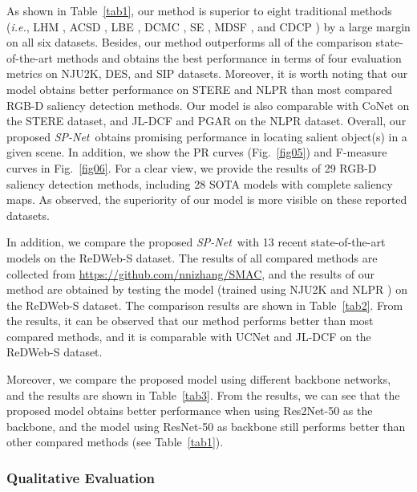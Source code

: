 \documentclass[10pt,twocolumn,letterpaper]{article}
\def\ie{\emph{i.e.}}
\def\ours{\emph{SP-Net}}
\begin{document}
As shown in Table~\ref{tab1}, our method is superior to eight traditional methods (\ie, LHM \cite{peng2014rgbd}, ACSD \cite{ju2014depth}, LBE \cite{feng2016local}, DCMC \cite{cong2016saliency}, SE \cite{guo2016salient}, MDSF \cite{song2017depth}, and CDCP \cite{zhu2017innovative}) by a large margin on all six datasets. Besides, our method outperforms all of the comparison state-of-the-art methods and obtains the best performance in terms of four evaluation metrics on NJU2K, DES, and SIP datasets. Moreover, it is worth noting that our model obtains better performance on STERE and NLPR than most compared RGB-D saliency detection methods. Our model is also comparable with CoNet on the STERE dataset, and JL-DCF and PGAR on the NLPR dataset. Overall, our proposed \ours~obtains promising performance in locating salient object(s) in a given scene. In addition, we show the PR curves \cite{borji2015salient} (Fig.~\ref{fig05}) and F-measure curves in Fig.~\ref{fig06}. For a clear view, we provide the results of 29 RGB-D saliency detection methods, including 28 SOTA models with complete saliency maps. As observed, the superiority of our model is more visible on these reported datasets.

In addition, we compare the proposed \ours~with 13 recent state-of-the-art models on the ReDWeb-S dataset. The results of all compared methods are collected from \url{https://github.com/nnizhang/SMAC}, and the results of our method are obtained by testing the model (trained using NJU2K \cite{ju2014depth} and NLPR \cite{peng2014rgbd}) on the ReDWeb-S dataset. The comparison results are shown in Table~\ref{tab2}. From the results, it can be observed that our method performs better than most compared methods, and it is comparable with UCNet and JL-DCF on the ReDWeb-S dataset.


Moreover, we compare the proposed model using different backbone networks, and the results are shown in Table~\ref{tab3}. From the results, we can see that the proposed model obtains better performance when using Res2Net-50 as the backbone, and the model using ResNet-50 as backbone still performs better than other compared methods (see Table~\ref{tab1}).



\subsubsection{Qualitative Evaluation}
\end{document}
